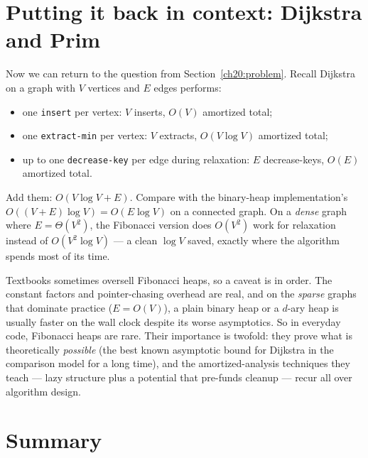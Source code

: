\section{Putting it back in context: Dijkstra and Prim}

Now we can return to the question from Section~\ref{ch20:problem}. Recall Dijkstra
on a graph with
$V$ vertices and $E$ edges performs:

\begin{itemize}
  \item one \lstinline|insert| per vertex: $V$ inserts, $O(V)$ amortized total;
  \item one \lstinline|extract-min| per vertex: $V$ extracts, $O(V \log V)$
        amortized total;
  \item up to one \lstinline|decrease-key| per edge during relaxation: $E$
        decrease-keys, $O(E)$ amortized total.
\end{itemize}

Add them: $O(V \log V + E)$. Compare with the binary-heap implementation's
$O((V+E)\log V) = O(E\log V)$ on a connected graph. On a \emph{dense} graph where
$E = \Theta(V^2)$, the Fibonacci version does $O(V^2)$ work for relaxation instead
of $O(V^2\log V)$ --- a clean $\log V$ saved, exactly where the algorithm spends
most of its time.

\begin{aestheticbox}
Textbooks sometimes oversell Fibonacci heaps, so a caveat is in order. The constant factors and pointer-chasing overhead are real, and on the
\emph{sparse} graphs that dominate practice ($E = O(V)$), a plain binary heap or a
$d$-ary heap is usually faster on the wall clock despite its worse asymptotics. So
in everyday code, Fibonacci heaps are rare. Their importance is twofold: they prove
what is theoretically \emph{possible} (the best known asymptotic bound for Dijkstra
in the comparison model for a long time), and the amortized-analysis techniques
they teach --- lazy structure plus a potential that pre-funds cleanup --- recur all
over algorithm design.
\end{aestheticbox}

\section{Summary}

